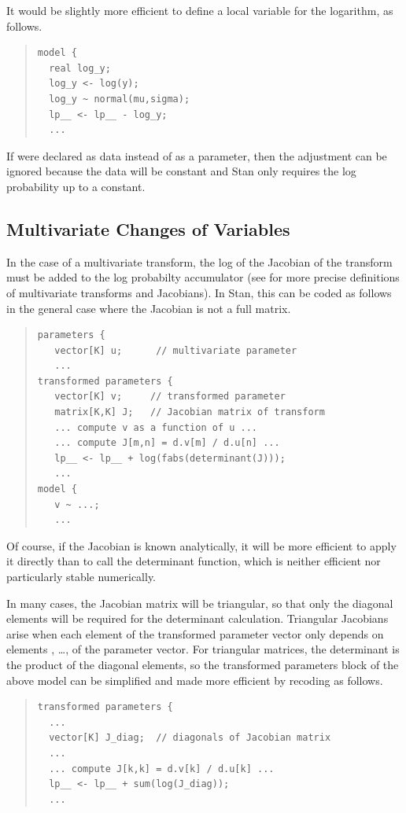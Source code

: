 It would be slightly more efficient to define a local variable for the
logarithm, as follows.
%
\begin{quote}
\begin{Verbatim}
model {
  real log_y;
  log_y <- log(y);
  log_y ~ normal(mu,sigma);
  lp__ <- lp__ - log_y;
  ...
\end{Verbatim}
\end{quote}
%

If  were declared as data instead of as a parameter, then the
adjustment can be ignored because the data will be constant and Stan
only requires the log probability up to a constant.

\subsection{Multivariate Changes of Variables}

In the case of a multivariate transform, the log of the Jacobian of
the transform must be added to the log probabilty accumulator (see
 for more precise definitions of multivariate transforms
and Jacobians).  In Stan, this can be coded as follows in the general
case where the Jacobian is not a full matrix.
%
\begin{quote}
\begin{Verbatim}
parameters {
   vector[K] u;      // multivariate parameter
   ...
transformed parameters {
   vector[K] v;     // transformed parameter
   matrix[K,K] J;   // Jacobian matrix of transform
   ... compute v as a function of u ...
   ... compute J[m,n] = d.v[m] / d.u[n] ...
   lp__ <- lp__ + log(fabs(determinant(J)));
   ...
model {
   v ~ ...;
   ...
\end{Verbatim}
\end{quote}
%
Of course, if the Jacobian is known analytically, it will be more
efficient to apply it directly than to call the determinant function,
which is neither efficient nor particularly stable numerically.

In many cases, the Jacobian matrix will be triangular, so that only
the diagonal elements will be required for the determinant
calculation.  Triangular Jacobians arise when each element 
of the transformed parameter vector only depends on elements
, \ldots,  of the parameter vector.  For
triangular matrices, the determinant is the product of the diagonal
elements, so the transformed parameters block of the above model can
be simplified and made more efficient by recoding as follows.
%
\begin{quote}
\begin{Verbatim}
transformed parameters {
  ...
  vector[K] J_diag;  // diagonals of Jacobian matrix
  ... 
  ... compute J[k,k] = d.v[k] / d.u[k] ...
  lp__ <- lp__ + sum(log(J_diag));
  ...
\end{Verbatim}
\end{quote}




